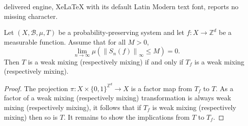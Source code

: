 \documentclass[10pt,a4paper]{amsart}
\newcommand{\B}{\mathcal{B}}
\newcommand{\Z}{\mathbb{Z}}
\begin{document}
delivered engine, XeLaTeX with its default Latin Modern text font, reports no missing character.
\begin{prop}\label{prop:WM}
Let $(X,\B,\mu,T)$ be a probability-preserving system and let $f:X\to \mathbb{Z}^d$ be a measurable function. Assume that for all $M>0$, 
\[
\lim_{n\to\infty}\mu\left(\left\|S_n(f)\right\|_\infty\leq M\right)=0.
\]
Then $T$ is a  weak mixing (respectively mixing) if and only if $T_f$ is a weak mixing (respectively mixing). 
\end{prop}

\begin{proof}
The projection $\pi: X\times\{0,1\}^{\Z^d}\to X$ is a factor map from $T_f$ to $T$. As a factor of a weak mixing (respectively mixing) transformation is always weak mixing (respectively mixing), it follows that if $T_f$ is weak mixing (respectively mixing) then so is $T$. It remains to show the implications from $T$ to $T_f$. 


\end{proof}
\end{document}
